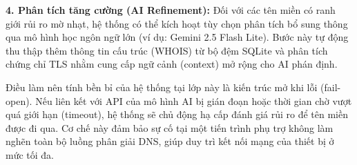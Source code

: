 \textbf{4. Phân tích tăng cường (AI Refinement):}
Đối với các tên miền có ranh giới rủi ro mờ nhạt, hệ thống có thể kích hoạt tùy chọn phân tích bổ sung thông qua mô hình học ngôn ngữ lớn (ví dụ: Gemini 2.5 Flash Lite). Bước này tự động thu thập thêm thông tin cấu trúc (WHOIS) từ bộ đệm SQLite và phân tích chứng chỉ TLS nhằm cung cấp ngữ cảnh (context) mở rộng cho AI phán định. 

Điều làm nên tính bền bỉ của hệ thống tại lớp này là kiến trúc mở khi lỗi (fail-open). Nếu liên kết với API của mô hình AI bị gián đoạn hoặc thời gian chờ vượt quá giới hạn (timeout), hệ thống sẽ chủ động hạ cấp đánh giá rủi ro để tên miền được đi qua. Cơ chế này đảm bảo sự cố tại một tiến trình phụ trợ không làm nghẽn toàn bộ luồng phân giải DNS, giúp duy trì kết nối mạng của thiết bị ở mức tối đa.
